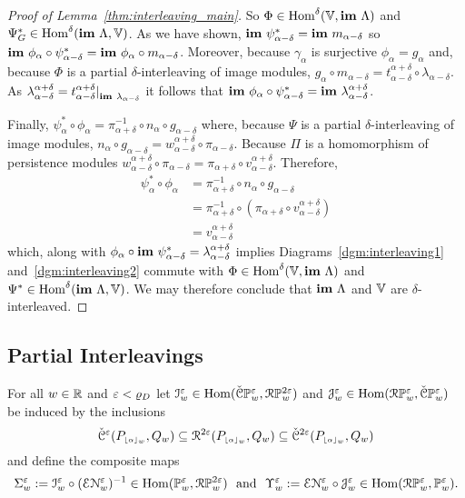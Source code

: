 \begin{proof}[Proof of Lemma~\ref{thm:interleaving_main}]
  So $\Phi\in\mathrm{Hom}^\delta(\mathbb{V},\mathbf{im}~\Lambda)$ and $\Psi_G^*\in\mathrm{Hom}^\delta(\mathbf{im}~\Lambda,\mathbb{V})$.
  As we have shown, $\mathbf{im}~\psi_{\alpha-\delta}^* = \mathbf{im}~m_{\alpha-\delta}$ so $\mathbf{im}~\phi_\alpha\circ\psi_{\alpha-\delta}^* = \mathbf{im}~\phi_\alpha\circ m_{\alpha-\delta}$.
  Moreover, because $\gamma_\alpha$ is surjective $\phi_\alpha = g_\alpha$ and, because $\Phi$ is a partial $\delta$-interleaving of image modules, $g_\alpha\circ m_{\alpha-\delta} = t_{\alpha-\delta}^{\alpha+\delta}\circ \lambda_{\alpha-\delta}$.
  As $\lambda_{\alpha-\delta}^{\alpha+\delta} = t_{\alpha-\delta}^{\alpha+\delta}\mathord{\mid}_{\mathbf{im}~\lambda_{\alpha-\delta}}$ it follows that $\mathbf{im}~\phi_\alpha\circ\psi_{\alpha-\delta}^* = \mathbf{im}~\lambda_{\alpha-\delta}^{\alpha+\delta}$.

  Finally, $\psi_\alpha^*\circ\phi_\alpha = \pi_{\alpha+\delta}^{-1}\circ n_\alpha\circ g_{\alpha-\delta}$ where, because $\Psi$ is a partial $\delta$-interleaving of image modules, $n_\alpha\circ g_{\alpha-\delta} = w_{\alpha-\delta}^{\alpha+\delta}\circ\pi_{\alpha-\delta}$.
  Because $\Pi$ is a homomorphism of persistence modules $w_{\alpha-\delta}^{\alpha+\delta}\circ \pi_{\alpha-\delta} = \pi_{\alpha+\delta}\circ v_{\alpha-\delta}^{\alpha+\delta}$.
  Therefore,
  \begin{align*}
    \psi_\alpha^*\circ\phi_\alpha &= \pi_{\alpha+\delta}^{-1}\circ n_\alpha\circ g_{\alpha-\delta}\\
      &= \pi_{\alpha+\delta}^{-1}\circ (\pi_{\alpha+\delta}\circ v_{\alpha-\delta}^{\alpha+\delta})\\
      &= v_{\alpha-\delta}^{\alpha+\delta}
  \end{align*}
  which, along with $\phi_\alpha\circ\mathbf{im}~\psi_{\alpha-\delta}^* = \lambda_{\alpha-\delta}^{\alpha+\delta}$ implies Diagrams~\ref{dgm:interleaving1} and~\ref{dgm:interleaving2} commute with $\Phi\in\mathrm{Hom}^\delta(\mathbb{V},\mathbf{im}~\Lambda)$ and $\Psi^*\in\mathrm{Hom}^\delta(\mathbf{im}~\Lambda, \mathbb{V})$.
  We may therefore conclude that $\mathbf{im}~\Lambda$ and $\mathbb{V}$ are $\delta$-interleaved.
\end{proof}

\subsection{Partial Interleavings}

For all $w\in\mathbb{R}$ and $\varepsilon < \varrho_D$ let $\mathcal{I}_w^\varepsilon\in\mathrm{Hom}(\check{\mathcal{C}}\mathbb{P}_{w}^{\varepsilon}, \mathcal{R}\mathbb{P}_{w}^{2\varepsilon})$ and $\mathcal{J}_w^\varepsilon\in\mathrm{Hom}(\mathcal{R}\mathbb{P}_{w}^{\varepsilon},\check{\mathcal{C}}\mathbb{P}_{w}^{\varepsilon})$ be induced by the inclusions
\[ \check{\mathcal{C}}^\varepsilon(P_{\scriptscriptstyle \lfloor\alpha\rfloor_{w}}, Q_w)\subseteq \mathcal{R}^{2\varepsilon}(P_{\scriptscriptstyle \lfloor\alpha\rfloor_{w}},Q_w)\subseteq \check{\mathcal{C}}^{2\varepsilon}(P_{\scriptscriptstyle \lfloor\alpha\rfloor_{w}}, Q_w)\]
and define the composite maps
\[\Sigma_w^\e := \I_w^\e\circ (\E\N_w^\e)^{-1}\in \Hom(\PP{w}{\e},\RPP{w}{2\e})\ \text{ and }\ \Upsilon_w^\e := \E\N_w^{\e}\circ \J_w^{\e}\in \Hom(\RPP{w}{\e},\PP{w}{\e}).\]

